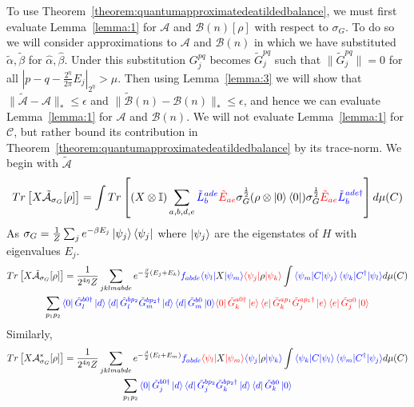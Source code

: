\documentclass[aps,floatfix,10pt,amssymb,amsfont,amsmath,superscriptaddress,float,nofootinbib,longbibliography,nobalancelastpage,twocolumn]{revtex4-2}
\begin{document}
\begin{widetext}
To use Theorem~\ref{theorem:quantumapproximatedeatildedbalance}, we must first evaluate Lemma~\ref{lemma:1} for $\mathcal{A}$ and $\mathcal{B}(n)[\rho]$ with respect to $\sigma_G$. To do so we will consider approximations to $\mathcal{A}$ and $\mathcal{B}(n)$ in which we have substituted $\tilde \alpha, \tilde \beta$ for $\hat \alpha, \hat \beta$. Under this substitution $G^{pq}_j$ becomes $\tilde G^{pq}_j$ such that $\|\tilde G^{pq}_j\| =0$ for all $|p-q-\frac{2^{\eta}}{2\pi}E_j|_{2^{\eta}} > \mu$. Then using Lemma~\ref{lemma:3} we will show that $\|\tilde{\mathcal{A}}-\mathcal{A}\|_* \leq \epsilon$ and $\|\tilde{\mathcal{B}}(n)-\mathcal{B}(n)\|_* \leq \epsilon$, and hence we can evaluate Lemma~\ref{lemma:1} for $\mathcal{A}$ and $\mathcal{B}(n)$. We will not evaluate Lemma~\ref{lemma:1} for $\mathcal{C}$, but rather bound its contribution in Theorem~\ref{theorem:quantumapproximatedeatildedbalance} by its trace-norm. We begin with $\tilde{\mathcal{A}}$
    \begin{equation}
    Tr\left[X\tilde{\mathcal{A}}_{\sigma_G}[\rho]\right] = \int Tr\left[(X\otimes \mathbb{I})\sum_{a,b,d,e}\textcolor{blue}{\tilde L^{ade}_b} \textcolor{red}{\tilde E_{ae}} \sigma_G^{\frac{1}{2}} (\rho\otimes \ket{0}\bra{0}) \sigma_G^{\frac{1}{2}}\textcolor{red}{\tilde E_{ae}}\textcolor{blue}{\tilde L^{ade\dagger}_b}\right] d\mu(C)
\end{equation}
As $\sigma_G = \frac{1}{Z}\sum_j e^{-\beta E_j} \ket{\psi_j}\bra{\psi_j}$ where $\ket{\psi_j}$ are the eigenstates of $H$ with eigenvalues $E_j$. 
\begin{multline}
    Tr\left[X\tilde{\mathcal{A}}_{\sigma_G}[\rho]\right] =\frac{1}{2^{4\eta}Z} \sum_{jklmabde} e^{-\frac{\beta}{2}(E_j+E_k)}\textcolor{blue}{f_{abde}} \textcolor{blue}{\bra{\psi_l}}X\textcolor{blue}{\ket{\psi_m}}\textcolor{red}{\bra{\psi_j}}\rho\textcolor{red}{\ket{\psi_k}} \int \textcolor{blue}{\braket{\psi_m|C|\psi_j}\braket{\psi_k|C^{\dagger}|\psi_l}} d\mu(C)\\\sum_{p_1p_2} \textcolor{blue}{\bra{0} \tilde G^{b0\dagger}_l\ket{d}\bra{d}\tilde G^{bp_2}_l\tilde G^{bp_2\dagger}_m\ket{d}\bra{d}\tilde G^{b0}_m\ket{0}}
    \textcolor{red}{\bra{0}\tilde G_k^{a0\dagger}\ket{e}\bra{e}\tilde G_k^{ap_1}\tilde G_j^{ap_1\dagger}\ket{e}\bra{e}\tilde G_j^{a0}\ket{0}}
    \label{eq:Arho}
\end{multline}
Similarly,
\begin{multline}
    Tr\left[X\mathcal{A}^*_{\sigma_G}[\rho]\right] =\frac{1}{2^{4\eta}Z} \sum_{jklmabde} e^{-\frac{\beta}{2}(E_l+E_m)}\textcolor{blue}{f_{abde}} \textcolor{red}{\bra{\psi_l}}X\textcolor{red}{\ket{\psi_m}}\textcolor{blue}{\bra{\psi_j}}\rho\textcolor{blue}{\ket{\psi_k}} \int \textcolor{blue}{\braket{\psi_k|C|\psi_l}\braket{\psi_m|C^{\dagger}|\psi_j}} d\mu(C)\\\sum_{p_1p_2} \textcolor{blue}{\bra{0} \tilde G^{b0\dagger}_j\ket{d}\bra{d}\tilde G^{bp_2}_j\tilde G^{bp_2\dagger}_k\ket{d}\bra{d}\tilde G^{b0}_k\ket{0}}

\end{multline}
\end{widetext}
\end{document}
